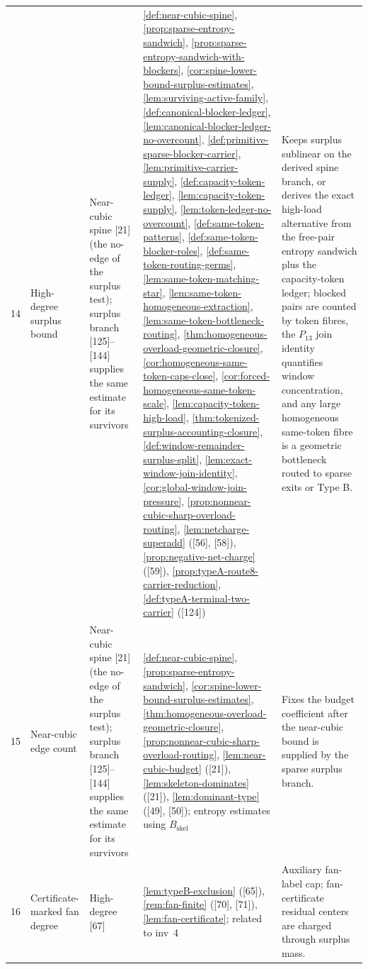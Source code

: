 \documentclass[11pt]{article}
\begin{document}
{\begin{longtable}{C{0.032\textwidth} L{0.145\textwidth} L{0.105\textwidth} L{0.50\textwidth} L{0.155\textwidth}}
14 & High-degree surplus bound & Near-cubic spine {[21]} (the no-edge of the surplus test); surplus branch {[125]--[144]} supplies the same estimate for its survivors & \cref{def:near-cubic-spine}, \cref{prop:sparse-entropy-sandwich}, \cref{prop:sparse-entropy-sandwich-with-blockers}, \cref{cor:spine-lower-bound-surplus-estimates}, \cref{lem:surviving-active-family}, \cref{def:canonical-blocker-ledger}, \cref{lem:canonical-blocker-ledger-no-overcount}, \cref{def:primitive-sparse-blocker-carrier}, \cref{lem:primitive-carrier-supply}, \cref{def:capacity-token-ledger}, \cref{lem:capacity-token-supply}, \cref{lem:token-ledger-no-overcount}, \cref{def:same-token-patterns}, \cref{def:same-token-blocker-roles}, \cref{def:same-token-routing-germs}, \cref{lem:same-token-matching-star}, \cref{lem:same-token-homogeneous-extraction}, \cref{lem:same-token-bottleneck-routing}, \cref{thm:homogeneous-overload-geometric-closure}, \cref{cor:homogeneous-same-token-caps-close}, \cref{cor:forced-homogeneous-same-token-scale}, \cref{lem:capacity-token-high-load}, \cref{thm:tokenized-surplus-accounting-closure}, \cref{def:window-remainder-surplus-split}, \cref{lem:exact-window-join-identity}, \cref{cor:global-window-join-pressure}, \cref{prop:nonnear-cubic-sharp-overload-routing}, \cref{lem:netcharge-superadd} ([56], [58]), \cref{prop:negative-net-charge} ([59]), \cref{prop:typeA-route8-carrier-reduction}, \cref{def:typeA-terminal-two-carrier} ([124]) & Keeps surplus sublinear on the derived spine branch, or derives the exact high-load alternative from the free-pair entropy sandwich plus the capacity-token ledger; blocked pairs are counted by token fibres, the \(P_{13}\) join identity quantifies window concentration, and any large homogeneous same-token fibre is a geometric bottleneck routed to sparse exits or Type B. \\
15 & Near-cubic edge count & Near-cubic spine {[21]} (the no-edge of the surplus test); surplus branch {[125]--[144]} supplies the same estimate for its survivors & \cref{def:near-cubic-spine}, \cref{prop:sparse-entropy-sandwich}, \cref{cor:spine-lower-bound-surplus-estimates}, \cref{thm:homogeneous-overload-geometric-closure}, \cref{prop:nonnear-cubic-sharp-overload-routing}, \cref{lem:near-cubic-budget} ([21]), \cref{lem:skeleton-dominates} ([21]), \cref{lem:dominant-type} ([49], [50]); entropy estimates using $B_{\mathrm{skel}}$ & Fixes the budget coefficient after the near-cubic bound is supplied by the sparse surplus branch. \\
16 & Certificate-marked fan degree & High-degree {[67]} & \cref{lem:typeB-exclusion} ([65]), \cref{rem:fan-finite} ([70], [71]), \cref{lem:fan-certificate}; related to inv~4 & Auxiliary fan-label cap; fan-certificate residual centers are charged through surplus mass. \\

\end{longtable}}
\end{document}

